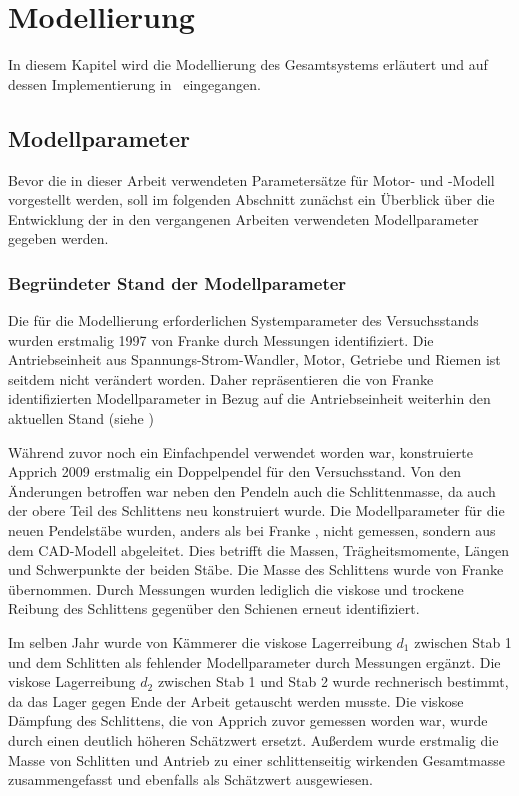 \chapter{Modellierung}\label{cha:modell}

In diesem Kapitel wird die Modellierung des Gesamtsystems erläutert und auf dessen Implementierung in \Simulink\ eingegangen.





\section{Modellparameter}\label{sec:mparams}

Bevor die in dieser Arbeit verwendeten Parametersätze für Motor- und \spd-Modell vorgestellt werden, soll im folgenden Abschnitt zunächst ein Überblick über die Entwicklung der in den vergangenen Arbeiten verwendeten Modellparameter gegeben werden.  


\subsection{Begründeter Stand der Modellparameter}\label{subsec:paramshist}

Die für die Modellierung erforderlichen Systemparameter des Versuchsstands wurden erstmalig 1997 von Franke \cite{franke} durch Messungen identifiziert. Die Antriebseinheit aus Spannungs-Strom-Wandler, Motor, Getriebe und Riemen ist seitdem nicht verändert worden. Daher repräsentieren die von Franke \cite{franke} identifizierten Modellparameter in Bezug auf die Antriebseinheit weiterhin den aktuellen Stand (siehe )
   
Während zuvor noch ein Einfachpendel verwendet worden war, konstruierte Apprich \cite{apprich} 2009 erstmalig ein Doppelpendel für den Versuchsstand. Von den Änderungen betroffen war neben den Pendeln auch die Schlittenmasse, da auch der obere Teil des Schlittens neu konstruiert wurde. Die Modellparameter für die neuen Pendelstäbe wurden, anders als bei Franke \cite{franke}, nicht gemessen, sondern aus dem CAD-Modell abgeleitet. Dies betrifft die Massen, Trägheitsmomente, Längen und Schwerpunkte der beiden Stäbe. Die Masse des Schlittens wurde von Franke \cite{franke} übernommen. Durch Messungen wurden lediglich die viskose und trockene Reibung des Schlittens gegenüber den Schienen erneut identifiziert. 

Im selben Jahr wurde von Kämmerer \cite{kämmerer} die viskose Lagerreibung $d_1$ zwischen Stab 1 und dem Schlitten als fehlender Modellparameter durch Messungen ergänzt. Die viskose Lagerreibung $d_2$ zwischen Stab 1 und Stab 2 wurde rechnerisch bestimmt, da das Lager gegen Ende der Arbeit getauscht werden musste. Die viskose Dämpfung des Schlittens, die von Apprich \cite{apprich} zuvor gemessen worden war, wurde durch einen deutlich höheren Schätzwert ersetzt. Außerdem wurde erstmalig die Masse von Schlitten und Antrieb zu einer schlittenseitig wirkenden Gesamtmasse zusammengefasst und ebenfalls als Schätzwert ausgewiesen.

